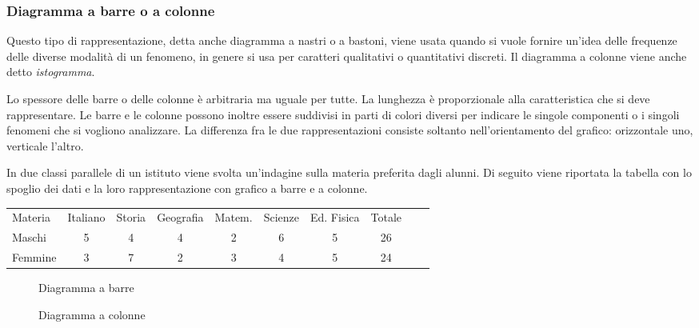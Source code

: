 \subsubsection{Diagramma a barre o a colonne}
Questo tipo di rappresentazione, detta anche diagramma a nastri o a 
bastoni, viene usata quando si vuole fornire un'idea delle frequenze
delle diverse modalità di un fenomeno, in genere si usa per caratteri 
qualitativi o quantitativi discreti.
Il diagramma a colonne viene anche detto \emph{istogramma}.

Lo spessore delle barre o delle colonne è arbitraria ma uguale per tutte. 
La lunghezza è proporzionale alla caratteristica che si deve rappresentare.
Le barre e le colonne possono inoltre essere suddivisi in parti di colori 
diversi per indicare le singole componenti o i singoli fenomeni
che si vogliono analizzare.
La differenza fra le due rappresentazioni consiste soltanto
nell'orientamento del grafico: orizzontale uno, verticale l'altro.

\begin{esempio}
In due classi parallele di un istituto viene svolta un'indagine sulla materia 
preferita dagli alunni.
Di seguito viene riportata la tabella con lo spoglio dei dati e la loro 
rappresentazione con grafico a barre e a colonne.
\end{esempio}

\begin{center}
 \begin{tabularx}{.95\textwidth}{X*{7}{c}Xc}
\toprule
Materia& Italiano &Storia & Geografia & Matem. & Scienze & Ed. Fisica & 
Totale\\
Maschi & 5 & 4& 4 & 2& 6 & 5& 26\\
Femmine & 3 & 7 & 2 & 3  & 4 & 5 & 24\\
\bottomrule
\end{tabularx}
\end{center}
\begin{center}
\begin{figure}[!h]
\begin{minipage}{.5\textwidth}
\begin{inaccessibleblock}
\scalebox{.8}{}
\caption{Diagramma a barre}
\end{inaccessibleblock}
\end{minipage} 
\begin{minipage}{.5\textwidth}
\begin{inaccessibleblock}
 \scalebox{.8}{}
\caption{Diagramma a colonne}
\end{inaccessibleblock}
\end{minipage}
\end{figure}
\end{center}


